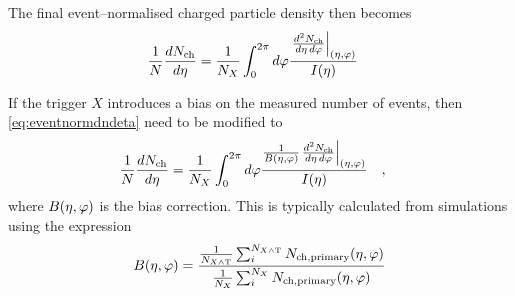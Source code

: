 \documentclass[11pt]{article}
\newcommand{\mult}[1][]{\ensuremath N_{\text{ch}#1}}
\newcommand{\dndetadphi}[1][]{{\ensuremath%
    \ifx|#1|\else\left.\fi%
    \frac{d^2\mult{}}{d\eta\,d\varphi}%
    \ifx|#1|\else\right|_{#1}\fi%
}}
\newcommand{\N}[2]{{\ensuremath N_{#1#2}}}
\newcommand{\etaphi}{\ensuremath(\eta,\varphi)}
\begin{document}
The final event--normalised charged particle density then becomes 
\begin{align}
  \frac{1}{N}\frac{dN_{\text{ch}}}{d\eta} &= 
  \frac{1}{\N{X}{}} \int_0^{2\pi} d\varphi
  \frac{\dndetadphi[\etaphi]}{I(\eta)}
  \label{eq:eventnormdndeta}
\end{align}

If the trigger $X$ introduces a bias on the measured number of events,
then \eqref{eq:eventnormdndeta} need to be modified to 
\begin{align}
  \frac{1}{N}\frac{dN_{\text{ch}}}{d\eta} &= 
  \frac{1}{\N{X}{}} \int_0^{2\pi} d\varphi
  \frac{\frac{1}{B\etaphi}\dndetadphi[\etaphi]}{I(\eta)}
  \label{eq:eventnormdndeta2}\quad,
\end{align}
where $B\etaphi$ is the bias correction.  This is typically
calculated from simulations using the expression 
\begin{align}
  B\etaphi = \frac{\frac{1}{\N{X\wedge
        \text{T}}{}}\sum_i^{\N{X\wedge \text{T}}{}}
    \mult[,\text{primary}]\etaphi}{\frac{1}{\N{X}{}}\sum_i^{\N{X}{}}
    \mult[,\text{primary}]\etaphi}
\end{align}
\end{document}
